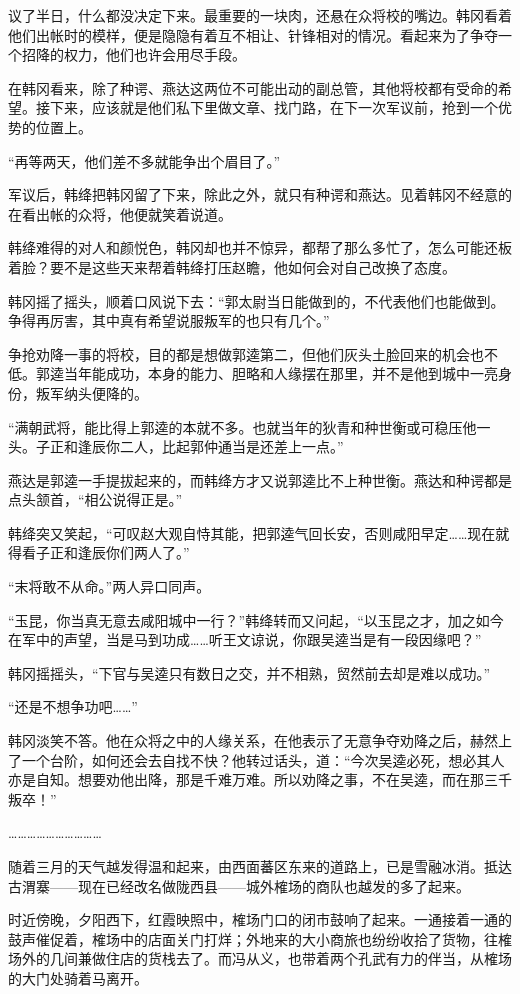 议了半日，什么都没决定下来。最重要的一块肉，还悬在众将校的嘴边。韩冈看着他们出帐时的模样，便是隐隐有着互不相让、针锋相对的情况。看起来为了争夺一个招降的权力，他们也许会用尽手段。

在韩冈看来，除了种谔、燕达这两位不可能出动的副总管，其他将校都有受命的希望。接下来，应该就是他们私下里做文章、找门路，在下一次军议前，抢到一个优势的位置上。

“再等两天，他们差不多就能争出个眉目了。”

军议后，韩绛把韩冈留了下来，除此之外，就只有种谔和燕达。见着韩冈不经意的在看出帐的众将，他便就笑着说道。

韩绛难得的对人和颜悦色，韩冈却也并不惊异，都帮了那么多忙了，怎么可能还板着脸？要不是这些天来帮着韩绛打压赵瞻，他如何会对自己改换了态度。

韩冈摇了摇头，顺着口风说下去：“郭太尉当日能做到的，不代表他们也能做到。争得再厉害，其中真有希望说服叛军的也只有几个。”

争抢劝降一事的将校，目的都是想做郭逵第二，但他们灰头土脸回来的机会也不低。郭逵当年能成功，本身的能力、胆略和人缘摆在那里，并不是他到城中一亮身份，叛军纳头便降的。

“满朝武将，能比得上郭逵的本就不多。也就当年的狄青和种世衡或可稳压他一头。子正和逢辰你二人，比起郭仲通当是还差上一点。”

燕达是郭逵一手提拔起来的，而韩绛方才又说郭逵比不上种世衡。燕达和种谔都是点头颔首，“相公说得正是。”

韩绛突又笑起，“可叹赵大观自恃其能，把郭逵气回长安，否则咸阳早定……现在就得看子正和逢辰你们两人了。”

“末将敢不从命。”两人异口同声。

“玉昆，你当真无意去咸阳城中一行？”韩绛转而又问起，“以玉昆之才，加之如今在军中的声望，当是马到功成……听王文谅说，你跟吴逵当是有一段因缘吧？”

韩冈摇摇头，“下官与吴逵只有数日之交，并不相熟，贸然前去却是难以成功。”

“还是不想争功吧……”

韩冈淡笑不答。他在众将之中的人缘关系，在他表示了无意争夺劝降之后，赫然上了一个台阶，如何还会去自找不快？他转过话头，道：“今次吴逵必死，想必其人亦是自知。想要劝他出降，那是千难万难。所以劝降之事，不在吴逵，而在那三千叛卒！”

…………………………

随着三月的天气越发得温和起来，由西面蕃区东来的道路上，已是雪融冰消。抵达古渭寨——现在已经改名做陇西县——城外榷场的商队也越发的多了起来。

时近傍晚，夕阳西下，红霞映照中，榷场门口的闭市鼓响了起来。一通接着一通的鼓声催促着，榷场中的店面关门打烊；外地来的大小商旅也纷纷收拾了货物，往榷场外的几间兼做住店的货栈去了。而冯从义，也带着两个孔武有力的伴当，从榷场的大门处骑着马离开。

